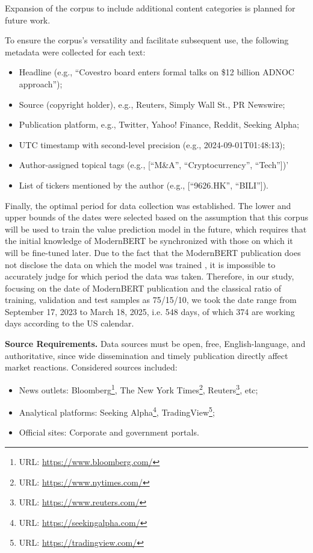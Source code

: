 Expansion of the corpus to include additional content categories is planned for future work.

To ensure the corpus's versatility and facilitate subsequent use, the following metadata were collected for each text:

\begin{itemize}
    \item Headline (e.g., “Covestro board enters formal talks on \$12 billion ADNOC approach”);
    \item Source (copyright holder), e.g., Reuters, Simply Wall St., PR Newswire;
    \item Publication platform, e.g., Twitter, Yahoo! Finance, Reddit, Seeking Alpha;
    \item UTC timestamp with second-level precision (e.g., 2024-09-01T01:48:13);
    \item Author-assigned topical tags (e.g., [“M\&A”, “Cryptocurrency”, “Tech”])'
    \item List of tickers mentioned by the author (e.g., [“9626.HK”, “BILI”]).
\end{itemize}

Finally, the optimal period for data collection was established. The lower and upper bounds of the dates were selected
based on the assumption that this corpus will be used to train the value prediction model in the future, which requires
that the initial knowledge of ModernBERT be synchronized with those on which it will be fine-tuned later. Due to the fact
that the ModernBERT publication does not disclose the data on which the model was trained \parencite{Warner2024ModernBERT},
it is impossible to accurately judge for which period the data was taken. Therefore, in our study, focusing
on the date of ModernBERT publication \parencite{Warner2024ModernBERT} and the classical ratio of training,
validation and test samples as 75/15/10, we took the date range from September 17, 2023 to March 18, 2025, i.e. 548 days,
of which 374 are working days according to the US calendar.

\textbf{Source Requirements.} Data sources must be open, free, English-language, and authoritative, since wide
dissemination and timely publication directly affect market reactions. Considered sources included:

\begin{itemize}
    \item News outlets: Bloomberg\footnote{URL: \url{https://www.bloomberg.com/}},
    The New York Times\footnote{URL: \url{https://www.nytimes.com/}},
    Reuters\footnote{URL: \url{https://www.reuters.com/}}, etc;
    \item Analytical platforms: Seeking Alpha\footnote{URL: \url{https://seekingalpha.com/}},
    TradingView\footnote{URL: \url{https://tradingview.com/}};
    \item Official sites: Corporate and government portals.
\end{itemize}

